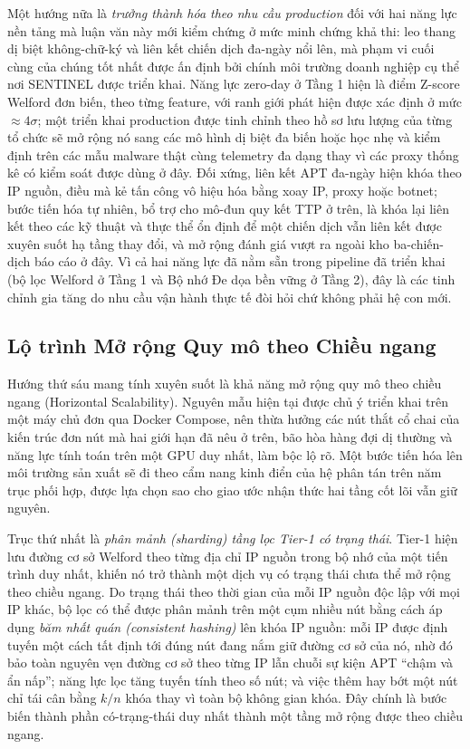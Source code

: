 Một hướng nữa là \emph{trưởng thành hóa theo nhu cầu production} đối với hai năng lực nền tảng mà luận văn này mới kiểm chứng ở mức minh chứng khả thi: leo thang dị biệt không-chữ-ký và liên kết chiến dịch đa-ngày nổi lên, mà phạm vi cuối cùng của chúng tốt nhất được ấn định bởi chính môi trường doanh nghiệp cụ thể nơi SENTINEL được triển khai. Năng lực zero-day ở Tầng 1 hiện là điểm Z-score Welford đơn biến, theo từng feature, với ranh giới phát hiện được xác định ở mức $\approx 4\sigma$; một triển khai production được tinh chỉnh theo hồ sơ lưu lượng của từng tổ chức sẽ mở rộng nó sang các mô hình dị biệt đa biến hoặc học nhẹ và kiểm định trên các mẫu malware thật cùng telemetry đa dạng thay vì các proxy thống kê có kiểm soát được dùng ở đây. Đối xứng, liên kết APT đa-ngày hiện khóa theo IP nguồn, điều mà kẻ tấn công vô hiệu hóa bằng xoay IP, proxy hoặc botnet; bước tiến hóa tự nhiên, bổ trợ cho mô-đun quy kết TTP ở trên, là khóa lại liên kết theo các kỹ thuật và thực thể ổn định để một chiến dịch vẫn liên kết được xuyên suốt hạ tầng thay đổi, và mở rộng đánh giá vượt ra ngoài kho ba-chiến-dịch báo cáo ở đây. Vì cả hai năng lực đã nằm sẵn trong pipeline đã triển khai (bộ lọc Welford ở Tầng 1 và Bộ nhớ Đe dọa bền vững ở Tầng 2), đây là các tinh chỉnh gia tăng do nhu cầu vận hành thực tế đòi hỏi chứ không phải hệ con mới.

\subsection{Lộ trình Mở rộng Quy mô theo Chiều ngang}
Hướng thứ sáu mang tính xuyên suốt là khả năng mở rộng quy mô theo chiều ngang (Horizontal Scalability). Nguyên mẫu hiện tại được chủ ý triển khai trên một máy chủ đơn qua Docker Compose, nên thừa hưởng các nút thắt cổ chai của kiến trúc đơn nút mà hai giới hạn đã nêu ở trên, bão hòa hàng đợi dị thường và năng lực tính toán trên một GPU duy nhất, làm bộc lộ rõ. Một bước tiến hóa lên môi trường sản xuất sẽ đi theo cẩm nang kinh điển của hệ phân tán trên năm trục phối hợp, được lựa chọn sao cho giao ước nhận thức hai tầng cốt lõi vẫn giữ nguyên.

Trục thứ nhất là \textit{phân mảnh (sharding) tầng lọc Tier-1 có trạng thái}. Tier-1 hiện lưu đường cơ sở Welford theo từng địa chỉ IP nguồn trong bộ nhớ của một tiến trình duy nhất, khiến nó trở thành một dịch vụ có trạng thái chưa thể mở rộng theo chiều ngang. Do trạng thái theo thời gian của mỗi IP nguồn độc lập với mọi IP khác, bộ lọc có thể được phân mảnh trên một cụm nhiều nút bằng cách áp dụng \emph{băm nhất quán (consistent hashing)} lên khóa IP nguồn: mỗi IP được định tuyến một cách tất định tới đúng nút đang nắm giữ đường cơ sở của nó, nhờ đó bảo toàn nguyên vẹn đường cơ sở theo từng IP lẫn chuỗi sự kiện APT ``chậm và ẩn nấp''; năng lực lọc tăng tuyến tính theo số nút; và việc thêm hay bớt một nút chỉ tái cân bằng $k/n$ khóa thay vì toàn bộ không gian khóa. Đây chính là bước biến thành phần có-trạng-thái duy nhất thành một tầng mở rộng được theo chiều ngang.

